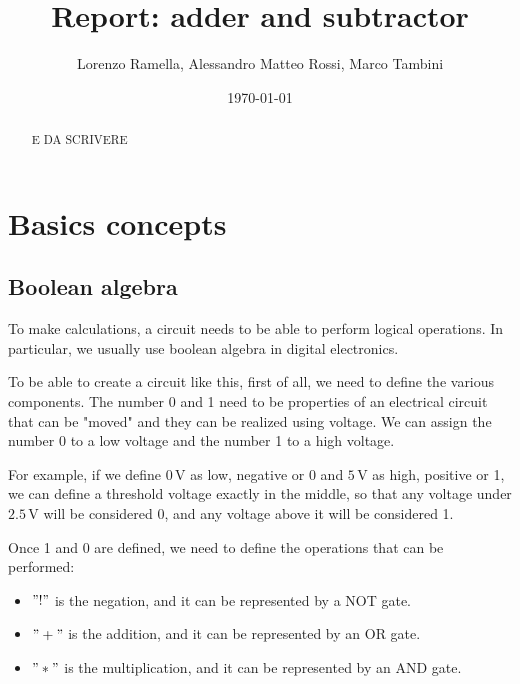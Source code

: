\documentclass{article}
\title{Report: adder and subtractor}
\author{Lorenzo Ramella, Alessandro Matteo Rossi, Marco Tambini}
\date{\today}
\begin{document}
\maketitle

\begin{abstract}
  E DA SCRIVERE
\end{abstract}
\clearpage
\tableofcontents

\clearpage

\section{Basics concepts}

\subsection{Boolean algebra}
To make calculations, a circuit needs to be able to perform logical operations. In particular, we usually use boolean algebra in digital electronics. 

\vspace{3mm}

To be able to create a circuit like this, first of all, we need to define the various components.
The number 0 and 1 need to be properties of an electrical circuit that can be "moved" and they can be realized using voltage. We can assign the number 0 to a low voltage and the number 1 to a high voltage. 

\vspace{3mm}

For example, if we define $0\,\textrm{V}$ as low, negative or 0 and $5\,\textrm{V}$ as high, positive or 1, we can define a threshold voltage exactly in the middle, so that any voltage under $2.5\,\textrm{V}$ will be considered 0, and any voltage above it will be considered 1.

\vspace{3mm}

Once 1 and 0 are defined, we need to define the operations that can be performed:

\begin{itemize}
\item $"!"$ is the negation, and it can be represented by a NOT gate.
\item $"+"$ is the addition, and it can be represented by an OR gate.
\item $"*"$ is the multiplication, and it can be represented by an AND gate.
\end{itemize}
\end{document}
